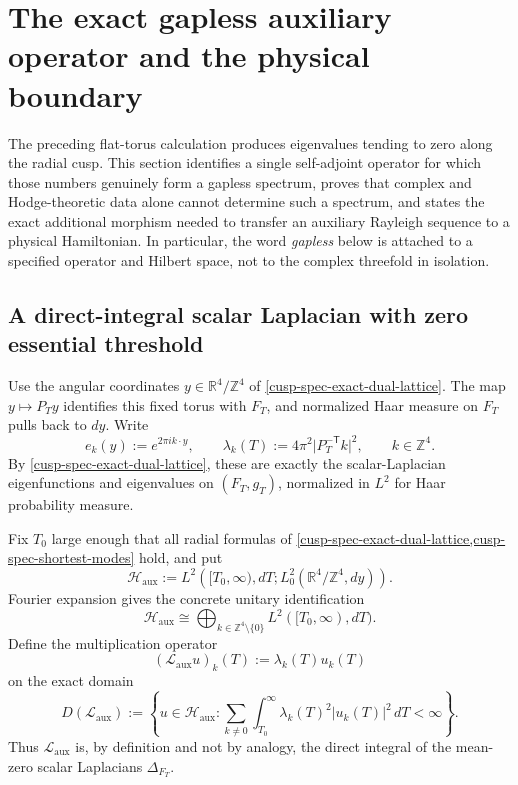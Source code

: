 \section{The exact gapless auxiliary operator and the physical boundary}
\label{cusp-interpretation-section}

The preceding flat-torus calculation produces eigenvalues tending to zero
along the radial cusp.  This section identifies a single self-adjoint
operator for which those numbers genuinely form a gapless spectrum, proves
that complex and Hodge-theoretic data alone cannot determine such a
spectrum, and states the exact additional morphism needed to transfer an
auxiliary Rayleigh sequence to a physical Hamiltonian.  In particular, the
word \emph{gapless} below is attached to a specified operator and Hilbert
space, not to the complex threefold in isolation.

\subsection{A direct-integral scalar Laplacian with zero essential threshold}
\label{cusp-interpretation-direct-integral-subsection}

Use the angular coordinates \(y\in\mathbb R^4/\mathbb Z^4\) of
\cref{cusp-spec-exact-dual-lattice}.  The map \(y\mapsto P_Ty\) identifies
this fixed torus with \(F_T\), and normalized Haar measure on \(F_T\) pulls
back to \(dy\).  Write
\[
 e_k(y):=e^{2\pi i k\cdot y},
 \qquad
 \lambda_k(T):=4\pi^2\lvert P_T^{-\mathsf T}k\rvert^2,
 \qquad k\in\mathbb Z^4.
\]
By \cref{cusp-spec-exact-dual-lattice}, these are exactly the
scalar-Laplacian eigenfunctions and eigenvalues on \((F_T,g_T)\), normalized
in \(L^2\) for Haar probability measure.

Fix \(T_0\) large enough that all radial formulas of
\cref{cusp-spec-exact-dual-lattice,cusp-spec-shortest-modes} hold, and put
\begin{equation}
 \mathscr H_{\mathrm{aux}}
 :=L^2\!\left([T_0,\infty),dT;
 L^2_0(\mathbb R^4/\mathbb Z^4,dy)\right).
 \label{cusp-interpretation-auxiliary-Hilbert-space}
\end{equation}
Fourier expansion gives the concrete unitary identification
\begin{equation}
 \mathscr H_{\mathrm{aux}}
 \cong
 \bigoplus_{k\in\mathbb Z^4\setminus\{0\}}
 L^2([T_0,\infty),dT).
 \label{cusp-interpretation-Fourier-direct-sum}
\end{equation}
Define the multiplication operator
\begin{equation}
 (\mathscr L_{\mathrm{aux}}u)_k(T)
 :=\lambda_k(T)u_k(T)
 \label{cusp-interpretation-direct-integral-operator}
\end{equation}
on the exact domain
\begin{equation}
 D(\mathscr L_{\mathrm{aux}})
 :=\left\{u\in\mathscr H_{\mathrm{aux}}:
 \sum_{k\ne0}\int_{T_0}^{\infty}
 \lambda_k(T)^2\lvert u_k(T)\rvert^2\,dT<\infty\right\}.
 \label{cusp-interpretation-direct-integral-domain}
\end{equation}
Thus \(\mathscr L_{\mathrm{aux}}\) is, by definition and not by analogy,
the direct integral of the mean-zero scalar Laplacians \(\Delta_{F_T}\).

